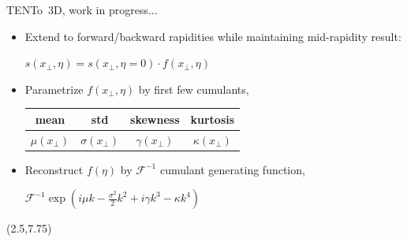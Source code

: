 \documentclass[xcolor=dvipsnames]{beamer}
\newcommand{\trento}{T\raisebox{-0.3ex}{R}ENTo}
\begin{document}
\begin{frame}[plain]{\trento\ 3D, work in progress...}
    \medskip
    \begin{itemize}
        \scriptsize
        \item Extend to forward/backward rapidities while maintaining mid-rapidity result:\\ 
            \begin{center}
                $s(x_\perp, \eta) = s(x_\perp, \eta=0) \cdot f(x_\perp, \eta)$
            \end{center}
        \item Parametrize $f(x_\perp, \eta)$ by first few cumulants,
            \begin{center}
                \begin{tabular}{cccc}
                    \hline
                    mean & std & skewness & kurtosis \\
                    \hline
                    $\mu(x_\perp)$ & $\sigma(x_\perp)$ & $\gamma(x_\perp)$ & $\kappa(x_\perp)$
                \end{tabular}
            \end{center}
        \item Reconstruct $f(\eta)$ by $\mathcal{F}^{-1}$ cumulant generating function,\\
            \begin{center}
                $\mathcal{F}^{-1} \exp(i\mu k - \frac{\sigma^2}{2} k^2 + i \gamma k^3 - \kappa k^4)$
            \end{center}
    \end{itemize}
    \vfill
    \begin{textblock}{1}(2.5,7.75)
    \end{textblock}
\end{frame}
\end{document}
